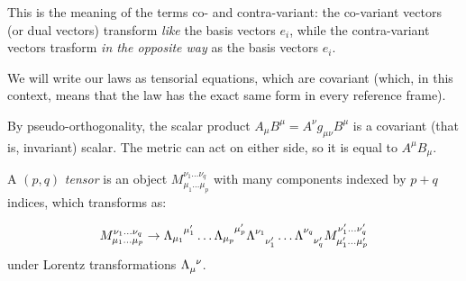 \documentclass[main.tex]{subfiles}
\begin{document}
\begin{bluebox}
This is the meaning of the terms co- and contra-variant: the co-variant vectors (or dual vectors) transform \emph{like} the basis vectors \(e_{i}\), while the contra-variant vectors trasform \emph{in the opposite way} as the basis vectors \(e_{i}\). 
\end{bluebox}

We will write our laws as tensorial equations, which are covariant (which, in this context, means that the law has the exact same form in every reference frame).

By pseudo-orthogonality, the scalar product \(A_\mu B^\mu = A^{\nu } g_{\mu \nu } B^{\mu }\) is a covariant (that is, invariant) scalar. The metric can act on either side, so it is equal to \(A^\mu B_\mu\).

\begin{definition}[Tensor]
    A \((p, q)\) \emph{tensor} is an object \(M_{\mu_1 \dots \mu_p}^{\nu_1 \dots \nu_q}\) with many components indexed by \(p+q\) indices, which transforms as:

    \begin{equation}
        M_{\mu_1 \dots \mu_p}^{\nu_1 \dots \nu_q}
        \rightarrow
        \tensor{\Lambda}{_{\mu_1}^{\mu'_1}}\dots
        \tensor{\Lambda}{_{\mu_p}^{\mu'_p}}
        \tensor{\Lambda}{^{\nu_1}_{\nu'_1}}\dots
        \tensor{\Lambda}{^{\nu_q}_{\nu'_q}}
        M_{\mu_1' \dots \mu_p'}^{\nu_1' \dots \nu_q'}
    \end{equation}
    under Lorentz transformations \(\tensor{\Lambda}{_\mu^\nu}\).
\end{definition}
\end{document}
